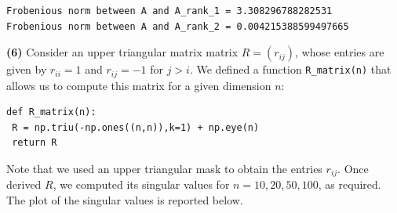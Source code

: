 \documentclass[a4paper,11pt]{article}
\begin{document}
\begin{verbatim}
Frobenious norm between A and A_rank_1 = 3.308296788282531
Frobenious norm between A and A_rank_2 = 0.004215388599497665
\end{verbatim}

\noindent \textbf{(6)} Consider an upper triangular matrix matrix $R = (r_{ij})$, whose entries are given by $r_{ii} = 1$ and $r_{ij} = -1$ for $j>i$. We defined a function \texttt{R_matrix(n)} that allows us to compute this matrix for a given dimension $n$:
\begin{verbatim}
def R_matrix(n):
 R = np.triu(-np.ones((n,n)),k=1) + np.eye(n)
 return R
\end{verbatim}
Note that we used an upper triangular mask to obtain the entries $r_{ij}$. Once derived $R$, we computed its singular values for $n = 10,20,50,100$, as required. The plot of the singular values is reported below. 
\end{document}
